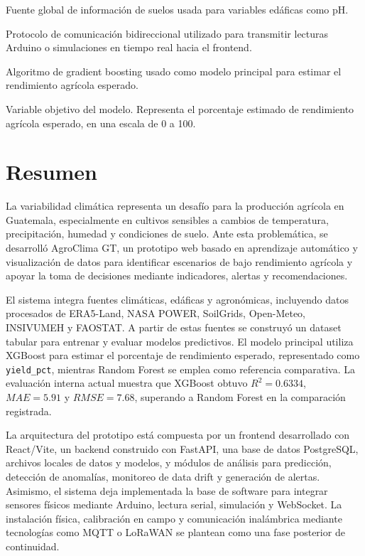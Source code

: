 \documentclass[12pt,letterpaper,oneside]{report}
\newcommand{\codigo}[1]{\texttt{#1}}
\begin{document}
\begin{description}[leftmargin=4cm,style=nextline]
\item[SoilGrids.] Fuente global de información de suelos usada para variables edáficas como pH.
\item[WebSocket.] Protocolo de comunicación bidireccional utilizado para transmitir lecturas Arduino o simulaciones en tiempo real hacia el frontend.
\item[XGBoost.] Algoritmo de gradient boosting usado como modelo principal para estimar el rendimiento agrícola esperado.
\item[Yield\_pct.] Variable objetivo del modelo. Representa el porcentaje estimado de rendimiento agrícola esperado, en una escala de 0 a 100.
\end{description}

\chapter*{Resumen}

La variabilidad climática representa un desafío para la producción agrícola en Guatemala, especialmente en cultivos sensibles a cambios de temperatura, precipitación, humedad y condiciones de suelo. Ante esta problemática, se desarrolló AgroClima GT, un prototipo web basado en aprendizaje automático y visualización de datos para identificar escenarios de bajo rendimiento agrícola y apoyar la toma de decisiones mediante indicadores, alertas y recomendaciones.

El sistema integra fuentes climáticas, edáficas y agronómicas, incluyendo datos procesados de ERA5-Land, NASA POWER, SoilGrids, Open-Meteo, INSIVUMEH y FAOSTAT. A partir de estas fuentes se construyó un dataset tabular para entrenar y evaluar modelos predictivos. El modelo principal utiliza XGBoost para estimar el porcentaje de rendimiento esperado, representado como \codigo{yield\_pct}, mientras Random Forest se emplea como referencia comparativa. La evaluación interna actual muestra que XGBoost obtuvo $R^2 = 0.6334$, $MAE = 5.91$ y $RMSE = 7.68$, superando a Random Forest en la comparación registrada.

La arquitectura del prototipo está compuesta por un frontend desarrollado con React/Vite, un backend construido con FastAPI, una base de datos PostgreSQL, archivos locales de datos y modelos, y módulos de análisis para predicción, detección de anomalías, monitoreo de data drift y generación de alertas. Asimismo, el sistema deja implementada la base de software para integrar sensores físicos mediante Arduino, lectura serial, simulación y WebSocket. La instalación física, calibración en campo y comunicación inalámbrica mediante tecnologías como MQTT o LoRaWAN se plantean como una fase posterior de continuidad.
\end{document}
